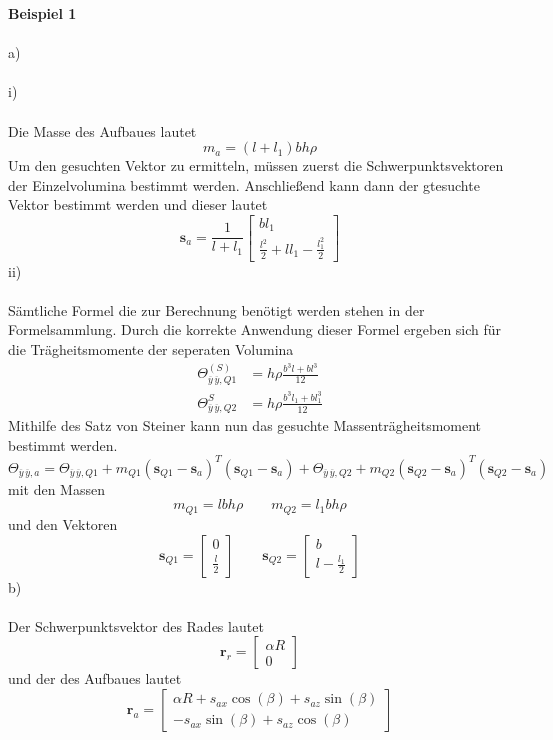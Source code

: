 \textbf{Beispiel 1}\\ \\
a)\\ \\
i)\\ \\
Die Masse des Aufbaues lautet
\[
	m_a = (l + l_1)bh\rho
\]
Um den gesuchten Vektor zu ermitteln, müssen zuerst die Schwerpunktsvektoren der Einzelvolumina bestimmt werden. Anschließend kann dann der gtesuchte Vektor bestimmt werden und dieser lautet
\[
	\textbf{s}_a = \frac{1}{l + l_1}\begin{bmatrix}
		bl_1 \\
		\frac{l^2}{2} + ll_1 - \frac{l_1^2}{2}
	\end{bmatrix}
\]
ii)\\ \\
Sämtliche Formel die zur Berechnung benötigt werden stehen in der Formelsammlung. Durch die korrekte Anwendung dieser Formel ergeben sich für die Trägheitsmomente der seperaten Volumina
\begin{align*}
	\varTheta_{\overline{y}\,\overline{y},Q1}^{(S)} &= h\rho\frac{b^3l + bl^3}{12} \\
	\varTheta_{\overline{y}\,\overline{y},Q2}^{S} &= h\rho\frac{b^3l_1 + bl_1^3}{12}
\end{align*}
Mithilfe des Satz von Steiner kann nun das gesuchte Massenträgheitsmoment bestimmt werden.
\[
	\varTheta_{\overline{y}\,\overline{y},a} = \varTheta_{\overline{y}\,\overline{y},Q1} + m_{Q1}(\textbf{s}_{Q1} - \textbf{s}_a)^T(\textbf{s}_{Q1} - \textbf{s}_a) + \varTheta_{\overline{y}\,\overline{y},Q2} + m_{Q2}(\textbf{s}_{Q2} - \textbf{s}_a)^T(\textbf{s}_{Q2} - \textbf{s}_a) 
\]
mit den Massen
\[
	m_{Q1} = lbh\rho \qquad m_{Q2} = l_1bh\rho
\]
und den Vektoren
\[
	\textbf{s}_{Q1} = \begin{bmatrix}
		0 \\
		\frac{l}{2}
	\end{bmatrix}
	\qquad
	\textbf{s}_{Q2} = \begin{bmatrix}
		b \\
		l - \frac{l_1}{2}
	\end{bmatrix}
\]
b)\\ \\
Der Schwerpunktsvektor des Rades lautet
\[
	\textbf{r}_r = \begin{bmatrix}
		\alpha R \\
		0
	\end{bmatrix}
\]
und der des Aufbaues lautet
\[
	\textbf{r}_a = \begin{bmatrix}
		\alpha R + s_{ax}\cos(\beta) + s_{az}\sin(\beta) \\
		- s_{ax}\sin(\beta) + s_{az}\cos(\beta)
	\end{bmatrix}
\]
